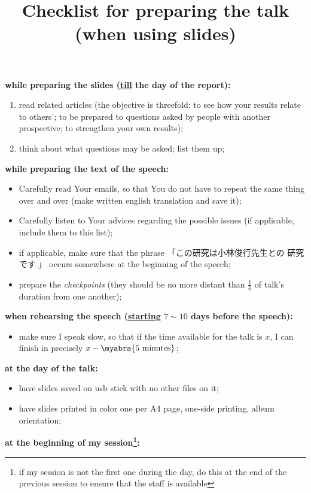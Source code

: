 \documentclass[12pt]{article} %
\title{Checklist for preparing the talk (when using slides)}
\newcommand{\kana}[2]{\ruby{#1}{#2}}
\begin{document}
	\maketitle
    \noindent\textbf{while preparing the slides (\underline{till} the day of the report):}
    \begin{enumerate}
        \item read related articles (the objective is threefold: to see how your results relate to others'; to
            be prepared to questions asked by people with another prospective; to strengthen your own results);
        \item think about what questions may be asked; list them up;
    \end{enumerate}
	\noindent\textbf{while preparing the text of the speech:}
	\begin{itemize}
		\item Carefully read Your emails, so that You do not have to repeat the same thing over and over (make written english translation
			and save it);
		\item Carefully listen to Your advices regarding the possible issues (if applicable, include them to this list);
		\item if applicable, make sure that the phrase 「この研究は小林俊行先生との\kana{共同}{キョウドウ}
            研究です.」 occurs somewhere at the beginning of the speech;
        \item prepare the {\it checkpoints} (they should be no more distant than $\frac{1}{6}$ of talk's duration
            from one another);
	\end{itemize}
    \textbf{when rehearsing the speech (\underline{starting} $7\sim10$ days before the speech):}
	\begin{itemize}
		\item make sure I speak slow, so that if the time available for the talk is $x$, I can finish in precisely $x-\myabra{\mbox{5 minutes}}$;
	\end{itemize}
	\textbf{at the day of the talk:}
	\begin{itemize}
		\item have slides saved on usb stick with no other files on it;
		\item have slides printed in color one per A4 page, one-side printing, album orientation;
	\end{itemize}
	\textbf{at the beginning of my session\footnote{\normalfont if my session is not the first one during the day, do this at the end of the previous session to ensure that
	the staff is available}:}
\end{document}
